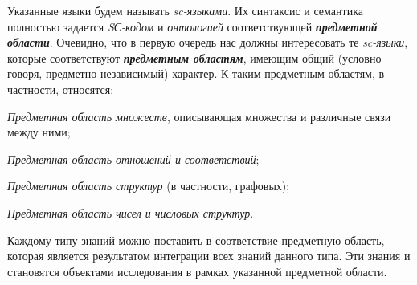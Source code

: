 \begin{SCn}
\begin{scnsubstruct}
\begin{scnsubstruct}
{                Указанные языки будем называть \textit{sc-языками}. Их синтаксис и семантика полностью задается \textit{SС-кодом} и \textit{онтологией} соответствующей \textbf{\textit{предметной области}}. Очевидно, что в первую очередь нас должны интересовать те \textit{sc-языки}, которые соответствуют \textbf{\textit{предметным областям}}, имеющим общий (условно говоря, предметно независимый) характер. К таким предметным областям, в частности, относятся:
                \begin{scnitemize}
                    \item \textit{Предметная область множеств}, описывающая множества и различные связи между ними;
                    \item \textit{Предметная область отношений и соответствий};
                    \item \textit{Предметная область структур} (в частности, графовых);
                    \item \textit{Предметная область чисел и числовых структур}.
                \end{scnitemize}
                Каждому типу знаний можно поставить в соответствие предметную область, которая является результатом интеграции всех знаний данного типа. Эти знания и становятся объектами исследования в рамках указанной предметной области.}
\end{scnsubstruct}
\end{scnsubstruct}
\end{SCn}
